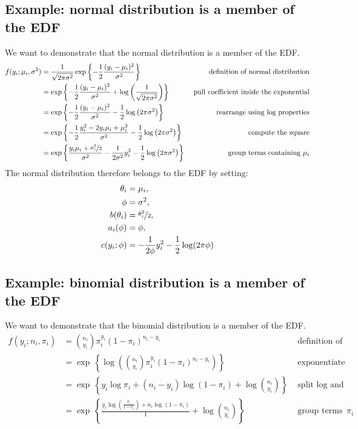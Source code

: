     \subsection{Example: normal distribution is a member of the EDF}
      We want to demonstrate that the normal distribution is a member of the
      EDF.
      \begin{align*}
      f(y_i; \mu_i, \sigma^2)
        &= \frac{1}{\sqrt{2\pi\sigma^2}} \exp\left\{-\frac{1}{2} \frac{(y_i-\mu_i)^2}{\sigma^2}\right\}
        & \text{ definition of normal distribution}\\
        &= \exp\left\{-\frac{1}{2} \frac{(y_i-\mu_i)^2}{\sigma^2} + \log\left(\frac{1}{\sqrt{2\pi\sigma^2}}\right)\right\}
        & \text{ pull coefficient inside the exponential}\\
        &= \exp\left\{-\frac{1}{2} \frac{(y_i-\mu_i)^2}{\sigma^2} -\frac{1}{2}\log\left(2\pi\sigma^2\right)\right\}
        & \text{ rearrange using log properties}\\
        &= \exp\left\{-\frac{1}{2} \frac{y_i^2-2y_i\mu_i+\mu_i^2}{\sigma^2} -\frac{1}{2}\log\left(2\pi\sigma^2\right)\right\}
        & \text{ compute the square}\\
        &= \exp\left\{\frac{y_i\mu_i+\nicefrac{\mu_i^2}{2}}{\sigma^2} - \frac{1}{2\sigma^2}y_i^2 - \frac{1}{2}\log\left(2\pi\sigma^2\right)\right\}
        & \text{ group terms containing } \mu_i\\
      \end{align*}
      The normal distribution therefore belongs to the EDF by setting:
      \begin{align*}
        \theta_i     &= \mu_i, \\
        \phi         &= \sigma^2, \\
        b(\theta_i)  &= \nicefrac{\theta_i^2}{2}, \\
        a_i(\phi)    &= \phi, \\
        c(y_i; \phi) &= - \frac{1}{2\phi} y_i^2 - \frac{1}{2}\log(2\pi\phi)
      \end{align*}

    \subsection{Example: binomial distribution is a member of the EDF}
      We want to demonstrate that the binomial distribution is a member of the
      EDF.
      \begin{align*}
      f(y_i; n_i, \pi_i)
        &= \binom{n_i}{y_i}\pi_i^{y_i}(1-\pi_i)^{n_i-y_i}
        & \text{ definition of binomial distribution}\\
        &= \exp\,\left\{\log\left(\binom{n_i}{y_i}\pi_i^{y_i}(1-\pi_i)^{n_i-y_i}\right)\right\}
        & \text{ exponentiate to compare with EDF} \\
        &= \exp\,\left\{y_i\log\pi_i+(n_i-y_i)\log(1-\pi_i)+\log\binom{n_i}{y_i}\right\}
        & \text{ split log and simplify}\\
        &= \exp\,\left\{\frac{y_i\log\left(\frac{\pi_i}{1-\pi_i}\right)+n_i\log(1-\pi_i)}{1}+\log\binom{n_i}{y_i}\right\}
        & \text{ group terms containing } \pi_i
      \end{align*}

